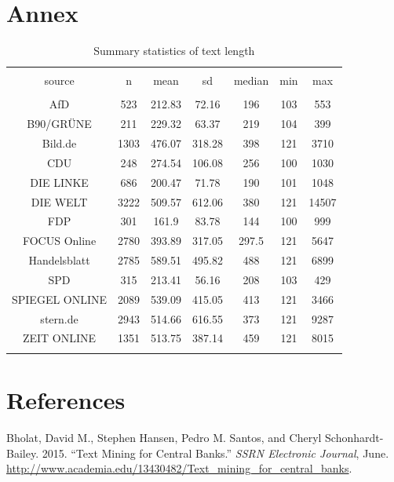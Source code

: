 \documentclass[
]{article}
\begin{document}
\hypertarget{annex}{%
\section{Annex}\label{annex}}

\begin{table}[!htbp] \centering 
  \caption{Summary statistics of text length} 
  \label{table:text_length} 
\begin{tabular}{@{\extracolsep{5pt}} ccccccc} 
\\[-1.8ex]\hline 
\hline \\[-1.8ex] 
source & n & mean & sd & median & min & max \\ 
\hline \\[-1.8ex] 
AfD & 523 & 212.83 & 72.16 & 196 & 103 & 553 \\ 
B90/GRÜNE & 211 & 229.32 & 63.37 & 219 & 104 & 399 \\ 
Bild.de & 1303 & 476.07 & 318.28 & 398 & 121 & 3710 \\ 
CDU & 248 & 274.54 & 106.08 & 256 & 100 & 1030 \\ 
DIE LINKE & 686 & 200.47 & 71.78 & 190 & 101 & 1048 \\ 
DIE WELT & 3222 & 509.57 & 612.06 & 380 & 121 & 14507 \\ 
FDP & 301 & 161.9 & 83.78 & 144 & 100 & 999 \\ 
FOCUS Online & 2780 & 393.89 & 317.05 & 297.5 & 121 & 5647 \\ 
Handelsblatt & 2785 & 589.51 & 495.82 & 488 & 121 & 6899 \\ 
SPD & 315 & 213.41 & 56.16 & 208 & 103 & 429 \\ 
SPIEGEL ONLINE & 2089 & 539.09 & 415.05 & 413 & 121 & 3466 \\ 
stern.de & 2943 & 514.66 & 616.55 & 373 & 121 & 9287 \\ 
ZEIT ONLINE & 1351 & 513.75 & 387.14 & 459 & 121 & 8015 \\ 
\hline \\[-1.8ex] 
\end{tabular} 
\end{table}

\hypertarget{references}{%
\section*{References}\label{references}}

\hypertarget{refs}{}
\leavevmode\hypertarget{ref-bholat_text_2015}{}%
Bholat, David M., Stephen Hansen, Pedro M. Santos, and Cheryl
Schonhardt-Bailey. 2015. ``Text Mining for Central Banks.'' \emph{SSRN
Electronic Journal}, June.
\url{http://www.academia.edu/13430482/Text_mining_for_central_banks}.
\end{document}
